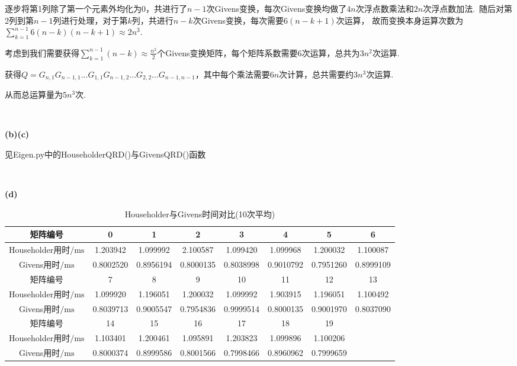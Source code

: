 \documentclass[UTF8]{ctexart}
\begin{document}
逐步将第1列除了第一个元素外均化为0，共进行了$n-1$次Givens变换，每次Givens变换均做了$4n$次浮点数乘法和$2n$次浮点数加法.\ 
随后对第2列到第$n-1$列进行处理，对于第$k$列，共进行$n-k$次Givens变换，每次需要$6(n-k+1)$次运算，
故而变换本身运算次数为$\sum_{k=1}^{n-1}6(n-k)(n-k+1)\approx 2n^3$.

考虑到我们需要获得$\sum_{k=1}^{n-1}(n-k)\approx \frac{n^2}{2}$个Givens变换矩阵，每个矩阵系数需要6次运算，总共为$3n^2$次运算.

获得$Q=G_{n,1}G_{n-1,1}...G_{1,1}G_{n-1,2}...G_{2,2}...G_{n-1,n-1}$，其中每个乘法需要$6n$次计算，总共需要约$3n^3$次运算.

从而总运算量为$5n^3$次.

~\

\noindent\textbf{(b)(c)}

见Eigen.py中的HouseholderQRD()与GivensQRD()函数

~\

\noindent\textbf{(d)}

\begin{table}[H]
    \centering
    \caption{Householder与Givens时间对比(10次平均)}
    \begin{tabular}{|c|ccccccc|}
        \hline
        矩阵编号 & 0 & 1 & 2 & 3 & 4 & 5 & 6 \\
        \hline
        Householder用时$/\mathrm{ms}$ & 1.203942 & 1.099992 & 2.100587 & 1.099420 & 1.099968 & 1.200032 & 1.100087 \\
        Givens用时$/\mathrm{ms}$ & 0.8002520 & 0.8956194 & 0.8000135 & 0.8038998 & 0.9010792 & 0.7951260 & 0.8999109 \\
        \hline
        矩阵编号 & 7 & 8 & 9 & 10 & 11 & 12 & 13 \\
        \hline
        Householder用时$/\mathrm{ms}$ & 1.099920 & 1.196051 & 1.200032 & 1.099992 & 1.903915 & 1.196051 & 1.100492 \\
        Givens用时$/\mathrm{ms}$ & 0.8039713 & 0.9005547 & 0.7954836 & 0.9999514 & 0.8000135 & 0.9001970 & 0.8037090 \\
        矩阵编号 & 14 & 15 & 16 & 17 & 18 & 19 & ~ \\
        \hline
        Householder用时$/\mathrm{ms}$ & 1.103401 & 1.200461 & 1.095891 & 1.203823 & 1.099896 & 1.100206 & ~ \\
        Givens用时$/\mathrm{ms}$ & 0.8000374 & 0.8999586 & 0.8001566 & 0.7998466 & 0.8960962 & 0.7999659 & ~ \\
        \hline
    \end{tabular}
\end{table}
\end{document}
